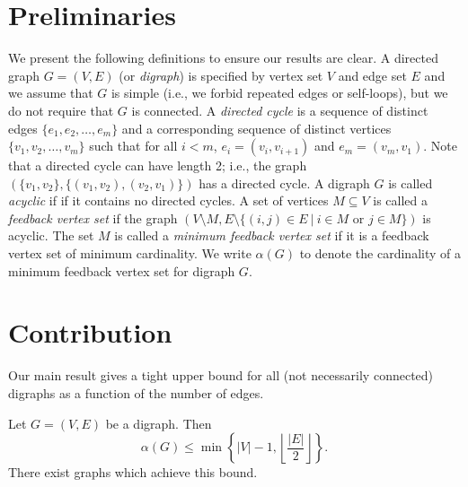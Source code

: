 \documentclass[CRMATH,Unicode,manuscript]{cedram}
\begin{document}
\section{Preliminaries}
We present the following definitions to ensure our results are clear.
A directed graph $G=(V,E)$ (or \emph{digraph}) is specified by vertex set $V$ and edge set $E$ and we assume that $G$ is simple (i.e., we forbid repeated edges or self-loops), but we do not require that $G$ is connected.
A \emph{directed cycle} is a sequence of distinct edges $\{e_1,e_2,\ldots,e_m\}$ and a corresponding sequence of distinct vertices $\{v_1,v_2,\ldots,v_m\}$ such that for all $i<m$, $e_i=(v_i,v_{i+1})$ and $e_m=(v_m,v_1)$.
Note that a directed cycle can have length 2; i.e., the graph $(\{v_1,v_2\},\{(v_1,v_2),(v_2,v_1)\})$ has a directed cycle.
A digraph $G$ is called \emph{acyclic} if if it contains no directed cycles.
A set of vertices $M\subseteq V$ is called a \emph{feedback vertex set} if the graph $\left(V\setminus M,E\setminus \{(i,j)\in E\ |\ i\in M \mbox{ or } j\in M\}\right)$ is acyclic.
The set $M$ is called a \emph{minimum feedback vertex set} if it is a feedback vertex set of minimum cardinality. 
We write $\alpha(G)$ to denote the cardinality of a minimum feedback vertex set for digraph $G$.

\section{Contribution}


Our main result gives a tight upper bound for all (not necessarily connected) digraphs as a function of the number of edges.
\begin{theo}\label{thm:main}
Let $G=(V,E)$ be a digraph.
Then
\begin{equation}\label{eq:main}
\alpha(G) \leq \min\left\{|V|-1,\left\lfloor\frac{|E|}{2}\right\rfloor\right\}.
\end{equation}
There exist graphs which achieve this bound.
\end{theo}
\end{document}
